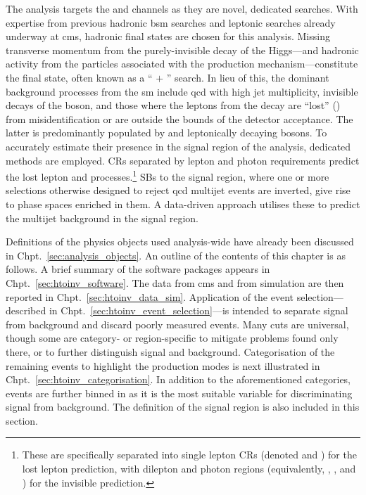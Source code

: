 The analysis targets the \ttH and \VH channels as they are novel, dedicated searches. With expertise from previous hadronic \acrshort{bsm} searches and leptonic \higgstoinv searches already underway at \acrshort{cms}, hadronic final states are chosen for this analysis. Missing transverse momentum from the purely-invisible decay of the Higgs---and hadronic activity from the particles associated with the production mechanism---constitute the final state, often known as a `` $+$ \ptvecmiss'' search. In lieu of this, the dominant background processes from the \acrlong{sm} include \acrshort{qcd} with high \gls{jet} multiplicity, invisible decays of the \PZ boson, and those where the leptons from the decay are ``lost'' (\lostlepton) from misidentification or are outside the bounds of the detector acceptance. The latter is predominantly populated by \ttbar and leptonically decaying \PW bosons. To accurately estimate their presence in the signal region of the analysis, dedicated methods are employed. \Glspl{CR} separated by lepton and photon requirements predict the lost lepton and \ztonunu processes.\footnote{These are specifically separated into single lepton \glspl{CR} (denoted \singleMuCr and \singleEleCr) for the lost lepton prediction, with dilepton and photon regions (equivalently, \doubleMuCr, \doubleEleCr, and \singlePhotonCr) for the invisible \PZ prediction.} \Glspl{SB} to the signal region, where one or more selections otherwise designed to reject \acrshort{qcd} multijet events are inverted, give rise to phase spaces enriched in them. A data-driven approach utilises these to predict the multijet background in the signal region.

Definitions of the physics objects used analysis-wide have already been discussed in Chpt.~\ref{sec:analysis_objects}. An outline of the contents of this chapter is as follows. A brief summary of the software packages appears in Chpt.~\ref{sec:htoinv_software}. The data from \acrshort{cms} and from simulation are then reported in Chpt.~\ref{sec:htoinv_data_sim}. Application of the event selection---described in Chpt.~\ref{sec:htoinv_event_selection}---is intended to separate signal from background and discard poorly measured events. Many cuts are universal, though some are category- or region-specific to mitigate problems found only there, or to further distinguish signal and background. Categorisation of the remaining events to highlight the production modes is next illustrated in Chpt.~\ref{sec:htoinv_categorisation}. In addition to the aforementioned categories, events are further binned in \ptmiss as it is the most suitable variable for discriminating signal from background. The definition of the signal region is also included in this section.

